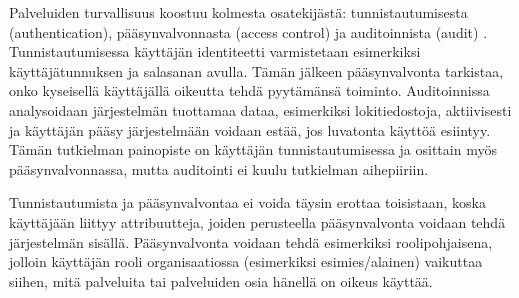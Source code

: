 Palveluiden turvallisuus koostuu kolmesta osatekijästä: tunnistautumisesta (authentication), pääsynvalvonnasta (access control) ja auditoinnista (audit) \cite{sandhu}. Tunnistautumisessa käyttäjän identiteetti varmistetaan esimerkiksi käyttäjätunnuksen ja salasanan avulla. Tämän jälkeen pääsynvalvonta tarkistaa, onko kyseisellä käyttäjällä oikeutta tehdä pyytämänsä toiminto. Auditoinnissa analysoidaan järjestelmän tuottamaa dataa, esimerkiksi lokitiedostoja, aktiivisesti ja käyttäjän pääsy järjestelmään voidaan estää, jos luvatonta käyttöä esiintyy. Tämän tutkielman pai\-no\-pis\-te on käyttäjän tunnistautumisessa ja osittain myös pääsynvalvonnassa, mutta auditointi ei kuulu tutkielman aihepiiriin.

Tunnistautumista ja pääsynvalvontaa ei voida täysin erottaa toisistaan, koska käyttäjään liittyy attribuutteja, joiden perusteella pääsynvalvonta voidaan tehdä järjestelmän sisällä. Pääsynvalvonta voidaan tehdä esimerkiksi roolipohjaisena, jolloin käyttäjän rooli organisaatiossa (esimerkiksi esimies/alainen) vaikuttaa siihen, mitä palveluita tai palveluiden osia hänellä on oikeus käyttää.